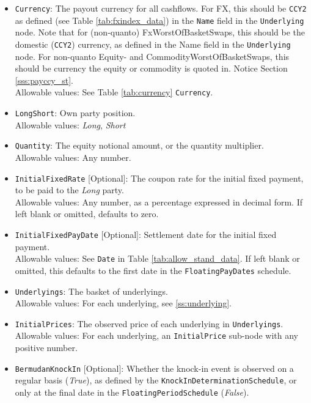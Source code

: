 \begin{itemize}
  \item \lstinline!Currency!: The payout currency for all cashflows. For FX, this should
  be \lstinline!CCY2! as defined (see Table \ref{tab:fxindex_data}) in the \lstinline!Name!
  field in the \lstinline!Underlying! node. Note that for (non-quanto) FxWorstOfBasketSwaps,
  this should be the domestic (\lstinline!CCY2!) currency, as defined in the Name field in the
  \lstinline!Underlying! node. For non-quanto Equity- and CommodityWorstOfBasketSwaps, this
  should be currency the equity or commodity is quoted in. Notice Section \ref{sss:payccy_st}. \\
    Allowable values: See Table \ref{tab:currency} \lstinline!Currency!.
  \item \lstinline!LongShort!: Own party position. \\
    Allowable values: \emph{Long}, \emph{Short}
  \item \lstinline!Quantity!: The equity notional amount, or the quantity multiplier. \\
    Allowable values: Any number.
  \item \lstinline!InitialFixedRate! [Optional]: The coupon rate for the initial fixed
  payment, to be paid to the \emph{Long} party. \\
    Allowable values: Any number, as a percentage expressed in decimal form. If left blank
    or omitted, defaults to zero.
  \item \lstinline!InitialFixedPayDate! [Optional]: Settlement date for the initial fixed
  payment. \\
    Allowable values: See \lstinline!Date! in Table \ref{tab:allow_stand_data}. If left blank
    or omitted, this defaults to the first date in the \lstinline!FloatingPayDates! schedule.
  \item \lstinline!Underlyings!: The basket of underlyings. \\
    Allowable values: For each underlying, see \ref{ss:underlying}.
  \item \lstinline!InitialPrices!: The observed price of each underlying in \lstinline!Underlyings!. \\
    Allowable values: For each underlying, an \lstinline!InitialPrice! sub-node with
    any positive number.
  \item \lstinline!BermudanKnockIn! [Optional]: Whether the knock-in event is observed
  on a regular basis (\emph{True}), as defined by the \lstinline!KnockInDeterminationSchedule!,
  or only at the final date in the \lstinline!FloatingPeriodSchedule! (\emph{False}). \\

\end{itemize}
